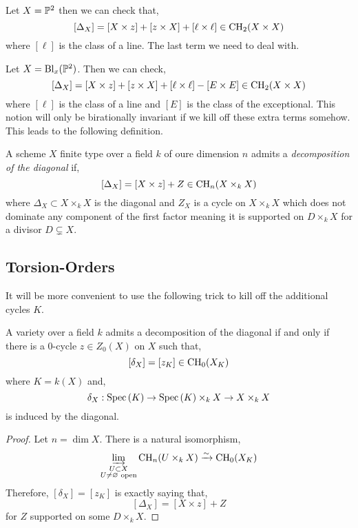 \documentclass[12pt]{article}
\begin{document}
\begin{example}
Let $X = \P^2$ then we can check that,
\[ [\Delta_X] = [X \times z] + [z \times X] + [\ell \times \ell] \in \CH_2(X \times X) \]
where $[\ell]$ is the class of a line. The last term we need to deal with.
\end{example}

\begin{example}
Let $X = \Bl_{x}(\P^2)$. Then we can check,
\[ [\Delta_X] = [X \times z] + [z \times X] + [\ell \times \ell] - [E \times E] \in \CH_2(X \times X) \]
where $[\ell]$ is the class of a line and $[E]$ is the class of the exceptional. This notion will only be birationally invariant if we kill off these extra terms somehow. This leads to the following definition.
\end{example}

\begin{defn}
A scheme $X$ finite type over a field $k$ of oure dimension $n$ admits a \textit{decomposition of the diagonal} if,
\[ [\Delta_X] = [X \times z] + Z \in \CH_{n}(X \times_k X) \]
where $\Delta_X \subset X \times_k X$ is the diagonal and $Z_X$ is a cycle on $X \times_k X$ which does not dominate any component of the first factor meaning it is supported on $D \times_k X$ for a divisor $D \subsetneq X$.
\end{defn}

\subsection{Torsion-Orders}

It will be more convenient to use the following trick to kill off the additional cycles $K$.

\begin{lemma}
A variety over a field $k$ admits a decomposition of the diagonal if and only if there is a $0$-cycle $z \in Z_0(X)$ on $X$ such that,
\[ [\delta_X] = [z_K] \in \CH_0(X_K) \]
where $K = k(X)$ and,
\[ \delta_X : \Spec{K} \to \Spec{K} \times_k X \to X \times_k X \]
is induced by the diagonal.
\end{lemma}

\begin{proof}
Let $n = \dim{X}$. There is a natural isomorphism,
\[ \dlim_{\substack{U \subset X \\ U \neq \empty \text{ open}}} \CH_n(U \times_k X) \iso \CH_0(X_K) \]
Therefore, $[\delta_X] = [z_K]$ is exactly saying that,
\[ [\Delta_X] = [X \times z] + Z \]
for $Z$ supported on some $D \times_k X$.
\end{proof}
\end{document}
